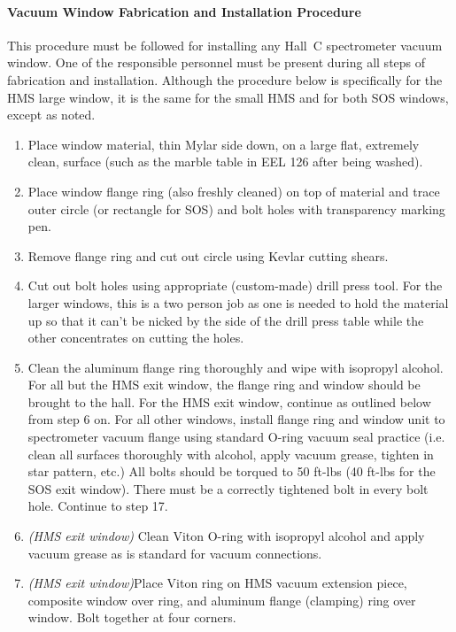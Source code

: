 \paragraph{Vacuum Window Fabrication and Installation Procedure}

This procedure must be followed for installing any Hall~C spectrometer
vacuum window. One of the responsible personnel must be present during
all steps of fabrication and installation.
Although the procedure below is specifically for
the HMS large window, it is the same for the small HMS and for both SOS windows,
except as noted.
\begin{enumerate}
\item{Place window material, thin Mylar side down,
on a large flat, extremely clean, surface (such as
the marble table in EEL 126 after being washed).}

\item{Place window flange ring (also freshly cleaned) on top of material
and trace outer
circle (or rectangle for SOS) and bolt holes with transparency marking
pen.}

\item{Remove flange ring and cut out circle using Kevlar cutting 
shears.}

\item{Cut out bolt holes using appropriate (custom-made) drill press tool.
For the larger windows, this is a two person job as one is needed to hold the
material up so that it can't be nicked by the side of the drill press table
while the other concentrates on cutting the holes.}

\item{Clean the aluminum flange ring thoroughly and wipe with isopropyl
alcohol. For all but the HMS exit window, the flange ring and
window should be brought to the hall.  For the HMS exit window,
continue as outlined below from step 6 on.  For all other windows,
install flange ring and window unit to spectrometer vacuum flange
using standard O-ring vacuum seal practice (i.e. clean all surfaces
thoroughly with alcohol, apply vacuum grease, tighten in star pattern,
etc.)  All bolts should be torqued to 50 ft-lbs (40 ft-lbs for the
SOS exit window).  There must be a correctly tightened bolt in every
bolt hole.  Continue to step 17.}

\item{{\sl (HMS exit window)} Clean Viton O-ring with isopropyl alcohol and apply vacuum
grease as is standard for vacuum connections.}

\item{{\sl (HMS exit window)}Place Viton ring on HMS vacuum extension piece, composite
window over ring, and aluminum flange (clamping) ring over window.   Bolt together at four corners.}


\end{enumerate}

